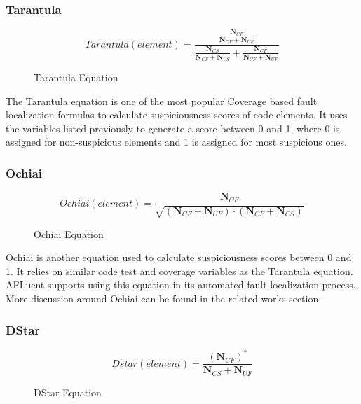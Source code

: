 \subsubsection{Tarantula}
\label{subsubsec:Tarantula}
\begin{figure}[!htb]
	\begin{center}
		\begin{equation}
			Tarantula(element) = \frac{\frac{\textbf{N$_{CF}$}}{\textbf{N$_{CF}$} + \textbf{N$_{UF}$}}}{\frac{\textbf{N$_{CS}$}}{\textbf{N$_{CS}$}+\textbf{N$_{US}$}} + \frac{\textbf{N$_{CF}$}}{\textbf{N$_{CF}$}+\textbf{N$_{UF}$}}}
		\end{equation}
		\caption{\label{fig:tarantulaEquation} Tarantula Equation\cite{Jones2005TarantulaEval}}
	\end{center}
\end{figure}

The Tarantula equation is one of the most popular Coverage based fault localization
formulas to calculate suspiciousness scores of code elements. It uses the
variables listed previously to generate a score between 0 and 1, where 0 is
assigned for non-suspicious elements and 1 is assigned for most suspicious ones.

\subsubsection{Ochiai}
\label{subsubsec:Ochiai}
\begin{figure}[!htb]
	\begin{center}
		\begin{equation}
			Ochiai(element) = \frac{\textbf{N$_{CF}$}}{\sqrt{(\textbf{N$_{CF}$}  + \textbf{N$_{UF}$}) \cdot (\textbf{N$_{CF}$}  + \textbf{N$_{CS}$})}}
		\end{equation}
		\caption{\label{fig:ochiaiEquation} Ochiai Equation\cite{Abreu2006Ochiai}}
	\end{center}
\end{figure}

Ochiai is another equation used to calculate suspiciousness scores between 0 and
1. It relies on similar code test and coverage variables as the Tarantula
equation. AFLuent supports using this equation in its automated fault
localization process. More discussion around Ochiai can be found in the related
works section.

\subsubsection{DStar}
\label{subsubsec:DStar}
\begin{figure}[!htb]
	\begin{center}
		\begin{equation}
			Dstar(element) = \frac{(\textbf{N$_{CF}$})^{\ast}}{\textbf{N$_{CS}$} + \textbf{N$_{UF}$}}
		\end{equation}
		\caption{\label{fig:dstarEquation} DStar Equation\cite{Wong2014DStar}}
	\end{center}
\end{figure}

